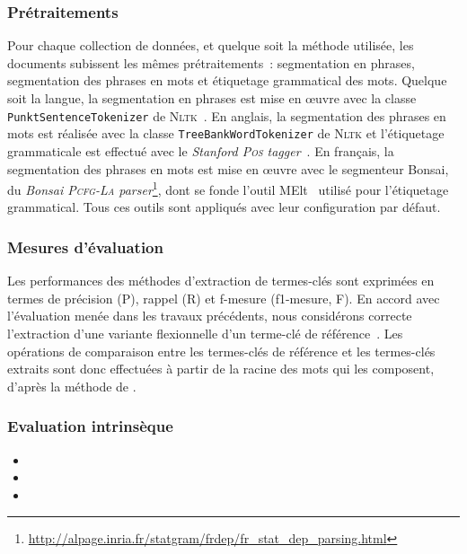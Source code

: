       \subsubsection{Prétraitements}
      \label{subsubsec:main-automatic_keyphrase_annotation-keyphrase_candidate_selection-evaluation-preprocessing}
        Pour chaque collection de données, et quelque soit la méthode utilisée,
        les documents subissent les mêmes prétraitements~: segmentation en
        phrases, segmentation des phrases en mots et étiquetage grammatical des
        mots. Quelque soit la langue, la segmentation en phrases est mise en
        \oe{}uvre avec la classe \texttt{PunktSentenceTokenizer} de
        \textsc{Nltk}~\cite{bird2009nltk}. En anglais, la segmentation des
        phrases en mots est réalisée avec la classe
        \texttt{TreeBankWordTokenizer} de \textsc{Nltk} et l'étiquetage
        grammaticale est effectué avec le \textit{Stanford \textsc{Pos}
        tagger}~\cite{toutanova2003stanfordpostagger}. En français, la
        segmentation des phrases en mots est mise en \oe{}uvre avec le
        segmenteur Bonsai, du \textit{Bonsai \textsc{Pcfg-La}
        parser}\footnote{\url{http://alpage.inria.fr/statgram/frdep/fr_stat_dep_parsing.html}},
        dont se fonde l'outil MElt~\cite{denis2009melt} utilisé pour
        l'étiquetage grammatical. Tous ces outils sont appliqués avec leur
        configuration par défaut.
      
      \subsubsection{Mesures d'évaluation}
      \label{subsubsec:main-automatic_keyphrase_annotation-keyphrase_candidate_selection-evaluation-evaluation_measures}

        Les performances des méthodes d'extraction de termes-clés sont exprimées
        en termes de précision (P), rappel (R) et f-mesure (f1-mesure, F). En
        accord avec l'évaluation menée dans les travaux précédents, nous
        considérons correcte l'extraction d'une variante flexionnelle d'un
        terme-clé de référence~\cite{kim2010semeval}. Les opérations de
        comparaison entre les termes-clés de référence et les termes-clés
        extraits sont donc effectuées à partir de la racine des mots qui les
        composent, d'après la méthode de .

      \subsubsection{Evaluation intrinsèque}
      \label{subsubsec:main-automatic_keyphrase_annotation-keyphrase_candidate_selection-evaluation-intrinsic_evaluation}
      \begin{itemize}
        \item{}
        \item{}
        \item{}
      \end{itemize}

